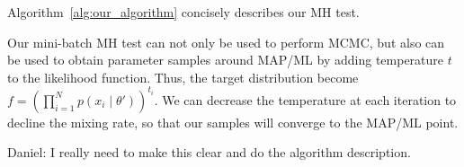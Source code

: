 \documentclass{article}
\begin{document}
Algorithm~\ref{alg:our_algorithm} concisely describes our MH test.

Our mini-batch MH test can not only be used to perform MCMC, but also can be used to obtain parameter samples around MAP/ML by adding temperature $t$ to the likelihood function. Thus, the target distribution become $f = \left ( \prod_{i=1}^N p(x_i \mid \theta') \right )^{t_i}$. We can decrease the temperature at each iteration to decline the mixing rate, so that our samples will converge to the MAP/ML point. 

{\color{blue}
Daniel: I really need to make this clear and do the algorithm description.
}

\end{document}
